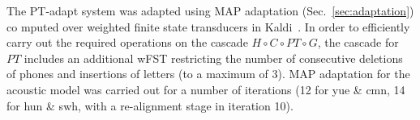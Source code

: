 \label{sec:ptadapt}

The {\sc PT-adapt} system was
adapted using MAP adaptation (Sec.~\ref{sec:adaptation})
co mputed over weighted finite state transducers in 
Kaldi~\cite{Kaldi2011}. In order to efficiently carry out the required
operations on the cascade $H\circ C\circ PT\circ G$,
the cascade for $PT$ includes an
additional wFST restricting the number of consecutive deletions of
phones and insertions of letters (to a maximum of 3).
MAP adaptation for
the acoustic model was carried out for a number of iterations (12 for
yue \& cmn, 14 for hun \& swh, with a re-alignment stage in iteration
10).

